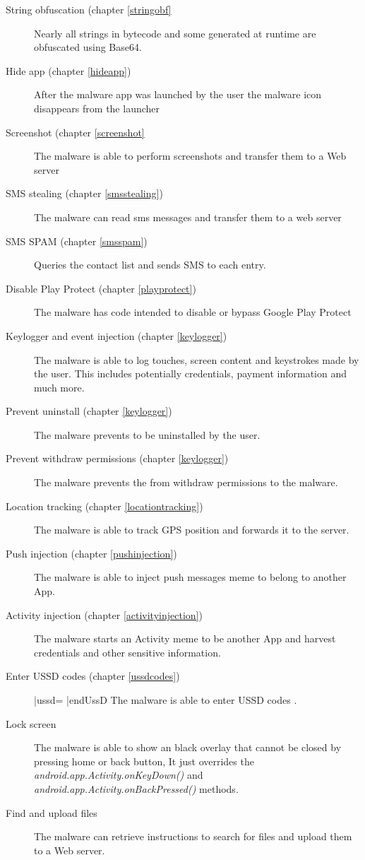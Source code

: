 \documentclass[10pt,titlepage]{article}
\begin{document}
\begin{description}
\item[String obfuscation (chapter \ref{stringobf}] Nearly all strings in bytecode and some generated at runtime are obfuscated using Base64.
\item[Hide app (chapter \ref{hideapp})] After the malware app was launched by the user the malware icon disappears from the launcher
\item[Screenshot (chapter \ref{screenshot}] The malware is able to perform screenshots and transfer them to a Web server
\item[SMS stealing (chapter \ref{smsstealing})] The malware can read sms messages and transfer them to a web server
\item[SMS SPAM (chapter \ref{smsspam})] Queries the contact list and sends SMS to each entry.
\item[Disable Play Protect (chapter \ref{playprotect})] The malware has code intended to disable or bypass Google Play Protect
\item[Keylogger and event injection (chapter \ref{keylogger})] The malware is able to log touches, screen content and keystrokes made by the user. This includes potentially credentials, payment information and much more. 
\item[Prevent uninstall (chapter \ref{keylogger})] The malware prevents to be uninstalled by the user.
\item[Prevent withdraw permissions (chapter \ref{keylogger})] The malware prevents the from withdraw permissions to the malware.
\item[Location tracking (chapter \ref{locationtracking})] The malware is able to track GPS position and forwards it to the server.
\item[Push injection (chapter \ref{pushinjection})]  The malware is able to inject push messages meme to belong to another App.
\item[Activity injection (chapter \ref{activityinjection})] The malware starts an Activity meme to be another App and harvest credentials and other sensitive information.
\item[Enter USSD codes (chapter \ref{ussdcodes})]  |ussd=    |endUssD The malware is able to enter USSD codes \cite{GSMTechnicalSpec}.
\item[Lock screen] The malware is able to show an black overlay that cannot be closed by pressing home or back button, It just overrides the \textit{android.app.Activity.onKeyDown()} and \textit{android.app.Activity.onBackPressed()} methods.
\item[Find and upload files] The malware can retrieve instructions to search for files and upload them to a Web server.
\end{description}
\end{document}
